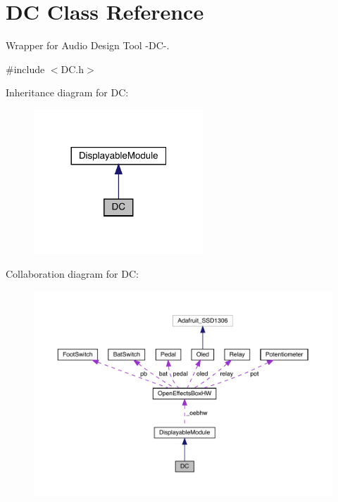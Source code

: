 \hypertarget{class_d_c}{}\section{DC Class Reference}
\label{class_d_c}


Wrapper for Audio Design Tool -\/\+D\+C-\/.  




{\ttfamily \#include $<$D\+C.\+h$>$}



Inheritance diagram for DC\+:
\nopagebreak
\begin{figure}[H]
\begin{center}
\leavevmode
\includegraphics[width=180pt]{class_d_c__inherit__graph}
\end{center}
\end{figure}


Collaboration diagram for DC\+:
\nopagebreak
\begin{figure}[H]
\begin{center}
\leavevmode
\includegraphics[width=350pt]{class_d_c__coll__graph}
\end{center}
\end{figure}
